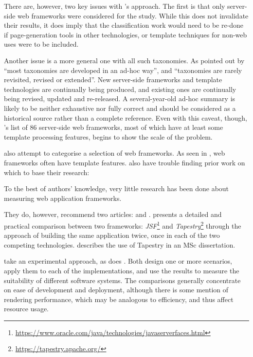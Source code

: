 There are, however, two key issues with \citeauthor{Vosloo2008}'s approach. The first is that only server-side web frameworks were considered for the study. While this does not invalidate their results, it does imply that the classification work would need to be re-done if page-generation tools in other technologies, or template techniques for non-web uses were to be included.

Another issue is a more general one with all such taxonomies. As pointed out by \citet{Usman2017} \enquote{most taxonomies are developed in an ad-hoc way}, and \enquote{taxonomies are rarely revisited, revised or extended}. New server-side frameworks and template technologies are continually being produced, and existing ones are continually being revised, updated and re-released. A several-year-old ad-hoc summary is likely to be neither exhaustive nor fully correct and should be considered as a historical source rather than a complete reference. Even with this caveat, though, \citeauthor{Vosloo2008}'s list of 86 server-side web frameworks, most of which have at least some template processing features, begins to show the scale of the problem.

\citet{Laakso2008} also attempt to categorise a selection of web frameworks. As seen in \citet{Vosloo2008}, web frameworks often have template features. \citet{Laakso2008} also have trouble finding prior work on which to base their research:

\begin{displayquote}
To the best of authors' knowledge, very little research has been done about measuring web application frameworks. \citep{Laakso2008}
\end{displayquote}

They do, however, recommend two articles: \citet{Zoio2005} and \citet{Kolesnikov2006}. \citeauthor{Zoio2005} presents a detailed and practical comparison between two frameworks: \emph{JSF}\footnote{\url{https://www.oracle.com/java/technologies/javaserverfaces.html}} and \emph{Tapestry}\footnote{\url{https://tapestry.apache.org/}} through the approach of building the same application twice, once in each of the two competing technologies. \citeauthor{Kolesnikov2006} describes the use of Tapestry in an MSc dissertation.

\citet{Laakso2008} take an experimental approach, as does \citet{Zoio2005}. Both design one or more scenarios, apply them to each of the implementations, and use the results to measure the suitability of different software systems. The comparisons generally concentrate on ease of development and deployment, although there is some mention of rendering performance, which may be analogous to efficiency, and thus affect resource usage. 

